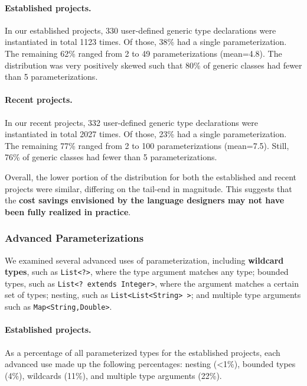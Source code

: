 \documentclass{svjour3}
\newcommand{\code}[1]{\texttt{#1}}
\begin{document}
\paragraph{Established projects.}In our established projects, 330 user-defined generic type declarations were instantiated in total 1123 times.  
Of those, 38\% had a single parameterization.
The remaining 62\% ranged from 2 to 49 parameterizations (mean=4.8). 
The distribution was very positively skewed such that 80\% of generic classes had fewer than 5 parameterizations.

\paragraph{Recent projects.}In our recent projects, 332 user-defined generic type declarations were instantiated in total 2027 times. 
Of those, 23\% had a single parameterization.  The remaining 77\% ranged from 2 to 100 parameterizations (mean=7.5).
Still, 76\% of generic classes had fewer than 5 parameterizations.  

Overall, the lower portion of the distribution for both the established and 
recent projects were similar, differing on the tail-end in magnitude.
This suggests that the \textbf{cost savings envisioned by the language designers
may not have been fully realized in practice}. 

\subsubsection{Advanced Parameterizations}

We examined several advanced uses of parameterization,
including \textbf{wildcard types}, such as \code{List<?>}, 
where the type argument matches any type;
bounded types, such as \code{List<? extends Integer>}, 
where the argument matches a certain set of types;
nesting, such as \code{List\textless List\textless String> >};
and multiple type arguments such as \code{Map<String,Double>}.

\paragraph{Established projects.}As a percentage of all parameterized types for the established projects, 
each advanced use made up the following percentages:
nesting (\textless 1\%),
bounded types (4\%), 
wildcards (11\%), and                                                                                                                         
multiple type arguments (22\%).
\end{document}
